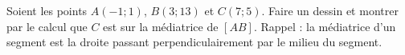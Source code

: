 
\begin{exercice}\label{exosmath-0565}

    Soient les points \( A(-1;1)\), \( B(3;13)\) et \( C(7;5)\). Faire un dessin et montrer par le calcul que \( C\) est sur la médiatrice de \( [AB]\). Rappel : la médiatrice d'un segment est la droite passant perpendiculairement par le milieu du segment.

\end{exercice}
